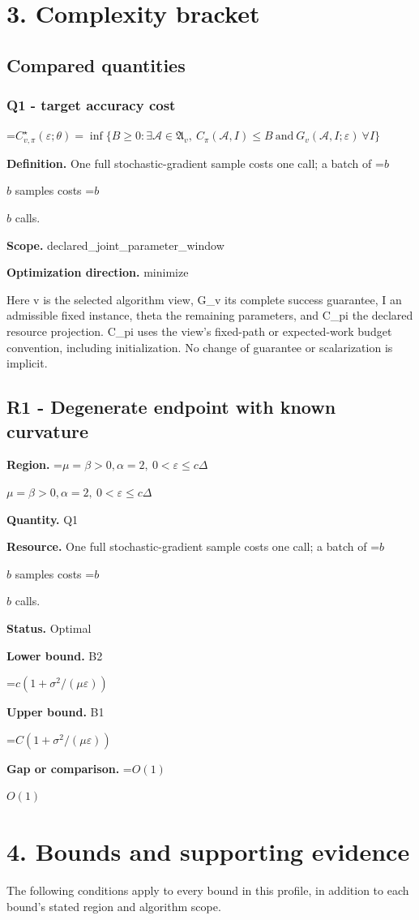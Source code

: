 \documentclass[10pt,a4paper]{article}
\newcommand{\AtlasMath}[1]{\par\begingroup\centering\setbox0=\hbox{$\displaystyle #1$}\ifdim\wd0>1.4\linewidth\typeout{ATLAS WIDE FORMULA: \the\wd0}\fi\ifdim\wd0>\linewidth\resizebox{\linewidth}{!}{\box0}\else\box0\fi\par\endgroup}
\newcommand{\AtlasInlineMath}[1]{\begingroup\setbox0=\hbox{$#1$}\ifdim\wd0>.4\linewidth\endgroup\AtlasMath{#1}\else\endgroup$#1$\fi}
\begin{document}
\section{3. Complexity bracket}
\subsection{Compared quantities}
\subsubsection{Q1 - target accuracy cost}
\AtlasMath{C^\star_{v,\pi}(\varepsilon;\theta)=\inf\{B\ge0:\exists\mathcal A\in\mathfrak A_v,\ C_\pi(\mathcal A,I)\le B\ \text{and}\ G_v(\mathcal A,I;\varepsilon)\ \forall I\}}
\textbf{Definition.} One full stochastic-gradient sample costs one call; a batch of \AtlasInlineMath{b} samples costs \AtlasInlineMath{b} calls.

\textbf{Scope.} declared\_joint\_parameter\_window

\textbf{Optimization direction.} minimize

Here v is the selected algorithm view, G\_v its complete success guarantee, I an admissible fixed instance, theta the remaining parameters, and C\_pi the declared resource projection. C\_pi uses the view's fixed-path or expected-work budget convention, including initialization. No change of guarantee or scalarization is implicit.

\subsection{R1 - Degenerate endpoint with known curvature}
\textbf{Region.} \AtlasInlineMath{\mu=\beta>0,\alpha=2,\ 0<\varepsilon\le c\Delta}

\textbf{Quantity.} Q1

\textbf{Resource.} One full stochastic-gradient sample costs one call; a batch of \AtlasInlineMath{b} samples costs \AtlasInlineMath{b} calls.

\textbf{Status.} Optimal

\textbf{Lower bound.} B2

\AtlasMath{c(1+\sigma^2/(\mu\varepsilon))}
\textbf{Upper bound.} B1

\AtlasMath{C(1+\sigma^2/(\mu\varepsilon))}
\textbf{Gap or comparison.} \AtlasInlineMath{O(1)}

\section{4. Bounds and supporting evidence}
The following conditions apply to every bound in this profile, in addition to each bound's stated region and algorithm scope.
\end{document}
